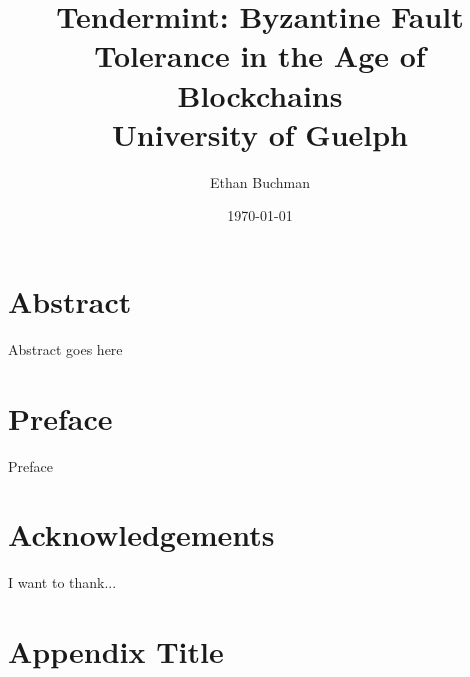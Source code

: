 \documentclass[12pt]{report}
\begin{document}
\title{
	{Tendermint: Byzantine Fault Tolerance in the Age of Blockchains}\\
	{\large University of Guelph}\\
}

\author{Ethan Buchman}
\date{\today}

\maketitle


\chapter*{Abstract}
Abstract goes here

\chapter*{Preface}
Preface

\chapter*{Acknowledgements}
I want to thank...

\tableofcontents
\listoffigures
\listoftables
{}














\appendix
\chapter{Appendix Title}

\end{document}
